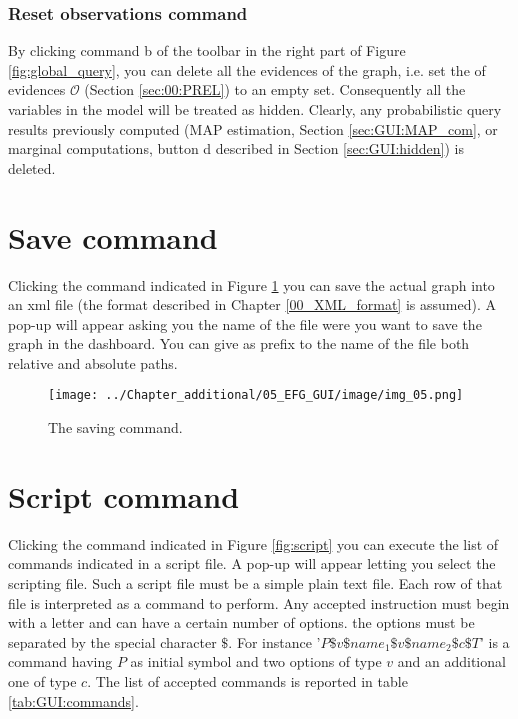 \subsubsection{Reset observations command}

By clicking command b of the toolbar in the right part of Figure \ref{fig:global_query}, you can delete all the evidences of the graph, i.e. set the of evidences $\mathcal{O}$ (Section \ref{sec:00:PREL}) to an empty set. Consequently all the variables in the model will be treated as hidden. Clearly, any probabilistic query results previously computed (MAP estimation, Section \ref{sec:GUI:MAP_com}, or marginal computations, button d described in Section \ref{sec:GUI:hidden}) is deleted.

\section{Save command}

Clicking the command indicated in Figure \ref{fig:save} you can save the actual graph into an xml file (the format described in Chapter \ref{00_XML_format} is assumed). A pop-up will appear asking you the name of the file were you want to save the graph in the dashboard. You can give as prefix to the name of the file both relative and absolute paths.

\begin{figure}
	\centering
	\texttt{[image: ../Chapter\_additional/05\_EFG\_GUI/image/img\_05.png]}
	\caption{The saving command.}
	\label{fig:save}
\end{figure} 

\section{Script command}

Clicking the command indicated in Figure \ref{fig:script} you can execute the list of commands indicated in a script file. A pop-up will appear letting you select the scripting file. Such a script file must be a simple plain text file. Each row of that file is interpreted as a command to perform.
Any accepted instruction must begin with a letter and can have a certain number of options. the options must be separated by the special character $\$$.
For instance '$P\$v\$name_1\$v\$name_2\$c\$T$' is a command having $P$ as initial symbol and two options of type $v$ and an additional one of type $c$.
The list of accepted commands is reported in table \ref{tab:GUI:commands}.

